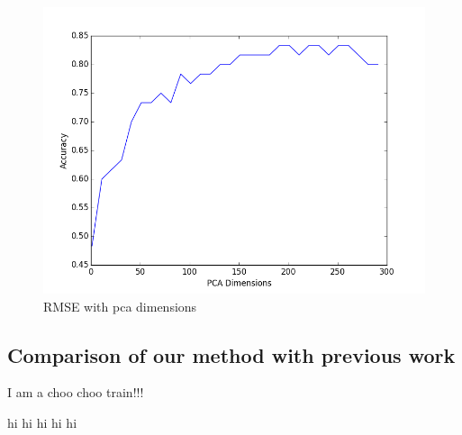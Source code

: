 \documentclass{article} %
\begin{document}
\begin{figure}[h]
\begin{center}
\includegraphics[scale=0.5]{accuracy_2of2.png}
\end{center}
\caption{RMSE with pca dimensions}
\end{figure}




\subsection{Comparison of our method with previous work}
I am a choo choo train!!!

hi hi hi hi hi



\end{document}
